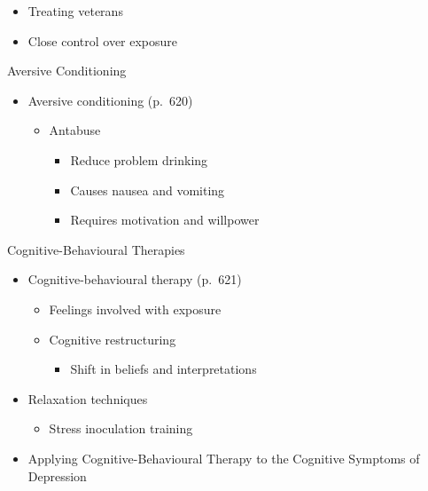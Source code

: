 \documentclass[
]{book}
\providecommand{\tightlist}{%
  \setlength{\itemsep}{0pt}\setlength{\parskip}{0pt}}
\begin{document}
\begin{reflect}
\begin{itemize}
  \begin{itemize}
  \tightlist
  \item
    Treating veterans\\
  \item
    Close control over exposure
  \end{itemize}
\end{itemize}

Aversive Conditioning

\begin{itemize}
\tightlist
\item
  Aversive conditioning (p.~620)

  \begin{itemize}
  \tightlist
  \item
    Antabuse

    \begin{itemize}
    \tightlist
    \item
      Reduce problem drinking\\
    \item
      Causes nausea and vomiting\\
    \item
      Requires motivation and willpower
    \end{itemize}
  \end{itemize}
\end{itemize}

Cognitive-Behavioural Therapies

\begin{itemize}
\tightlist
\item
  Cognitive-behavioural therapy (p.~621)

  \begin{itemize}
  \tightlist
  \item
    Feelings involved with exposure\\
  \item
    Cognitive restructuring

    \begin{itemize}
    \tightlist
    \item
      Shift in beliefs and interpretations\\
    \end{itemize}
  \end{itemize}
\item
  Relaxation techniques

  \begin{itemize}
  \tightlist
  \item
    Stress inoculation training\\
  \end{itemize}
\item
  Applying Cognitive-Behavioural Therapy to the Cognitive Symptoms of Depression


\end{itemize}
\end{reflect}
\end{document}
